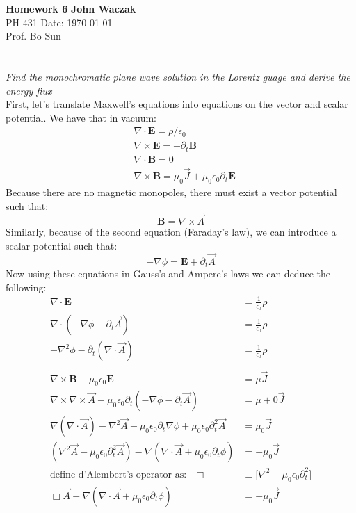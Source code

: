 \documentclass[a4paper, 11pt]{article}
\begin{document}
\noindent
\large\textbf{Homework 6} \hfill \textbf{John Waczak} \\
\normalsize PH 431 \hfill  Date: \today \\
Prof. Bo Sun  \\

\section{}
\textit{Find the monochromatic plane wave solution in the Lorentz guage and derive the energy flux}\\

\noindent First, let's translate Maxwell's equations into equations on the vector and scalar potential. We have that in vacuum: 
	\begin{align*}
		&\nabla \cdot \mathbf{E} = \rho/\epsilon_0 \\
		&\nabla \times \mathbf{E} = -\partial_t \mathbf{B} \\ 
		&\nabla \cdot \mathbf{B} = 0 \\ 
		&\nabla \times \mathbf{B} = \mu_0\vec{J} + \mu_0\epsilon_0\partial_t\mathbf{E} 
	\end{align*}
Because there are no magnetic monopoles, there must exist a vector potential such that: 
	\begin{equation*}
		\mathbf{B} = \nabla \times \vec{A} 
	\end{equation*} 
Similarly, because of the second equation (Faraday's law), we can introduce a scalar potential such that:
	\begin{equation*}
		-\nabla\phi = \mathbf{E} + \partial_t\vec{A}
	\end{equation*}
Now using these equations in Gauss's and Ampere's laws we can deduce the following: 
	\begin{align*}
		\nabla \cdot \mathbf{E} &= \frac{1}{\epsilon_0}\rho \\ 
		\nabla \cdot (-\nabla\phi - \partial_t\vec{A}) &= \frac{1}{\epsilon_0}\rho \\ 
		-\nabla^2\phi - \partial_t(\nabla \cdot \vec{A}) &= \frac{1}{\epsilon_0}\rho \\ 
		\quad \\ 
		\nabla \times \mathbf{B} - \mu_0\epsilon_0\mathbf{E} &= \mu\vec{J} \\ 
		\nabla \times \nabla \times \vec{A} -\mu_0\epsilon_0\partial_t(-\nabla \phi - \partial_t \vec{A}) &= \mu+0 \vec{J} \\ 
		\nabla(\nabla \cdot \vec{A})-\nabla^2\vec{A} + \mu_0\epsilon_0\partial_t\nabla\phi + \mu_0\epsilon_0\partial_t^2\vec{A} &= \mu_0\vec{J} \\ 
		(\nabla^2\vec{A}-\mu_0\epsilon_0\partial_t^2\vec{A})-\nabla(\nabla \cdot \vec{A} + \mu_0\epsilon_0\partial_t\phi) &= -\mu_0\vec{J} \\ 
		\text{define d'Alembert's operator as:}\quad \Box &\equiv \big[\nabla^2 -\mu_0\epsilon_0\partial_t^2\big] \\ 
		\Box \vec{A} - \nabla(\nabla\cdot\vec{A}+\mu_0\epsilon_0\partial_t\phi) &= -\mu_0\vec{J}
	\end{align*}
\end{document}
